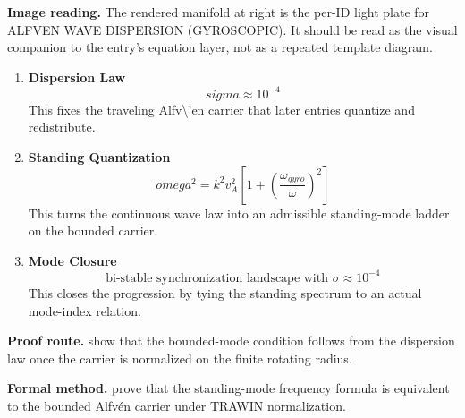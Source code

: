 \begin{samepage}
\noindent\begin{minipage}[t]{0.45\linewidth}
\vspace{0pt}
\raggedright
\scriptsize\textbf{Image reading.} The rendered manifold at right is the per-ID light plate for ALFVEN WAVE DISPERSION (GYROSCOPIC). It should be read as the visual companion to the entry's equation layer, not as a repeated template diagram.\par
\end{minipage}\hfill
\begin{minipage}[t]{0.53\linewidth}
\vspace*{-0.10in}
\raggedright
{}
\end{minipage}
\end{samepage}

\clearpage


\begin{enumerate}[leftmargin=1.6em,itemsep=9pt,topsep=6pt]
\item \textbf{Dispersion Law}
\[
sigma \approx 10^{-4}
\]
This fixes the traveling Alfv\textbackslash{}'en carrier that later entries quantize and redistribute.

\item \textbf{Standing Quantization}
\[
omega^2 = k^2 v_A^2 \left[ 1 + \left( \frac{\omega_{gyro}}{\omega} \right)^2 \right]
\]
This turns the continuous wave law into an admissible standing-mode ladder on the bounded carrier.

\item \textbf{Mode Closure}
\[
\text{bi-stable synchronization landscape with } \sigma \approx 10^{-4}
\]
This closes the progression by tying the standing spectrum to an actual mode-index relation.
\end{enumerate}

\textbf{Proof route.} show that the bounded-mode condition follows from the dispersion law once the carrier is normalized on the finite rotating radius.

\textbf{Formal method.} prove that the standing-mode frequency formula is equivalent to the bounded Alfv\'en carrier under TRAWIN normalization.

\medskip
{}


